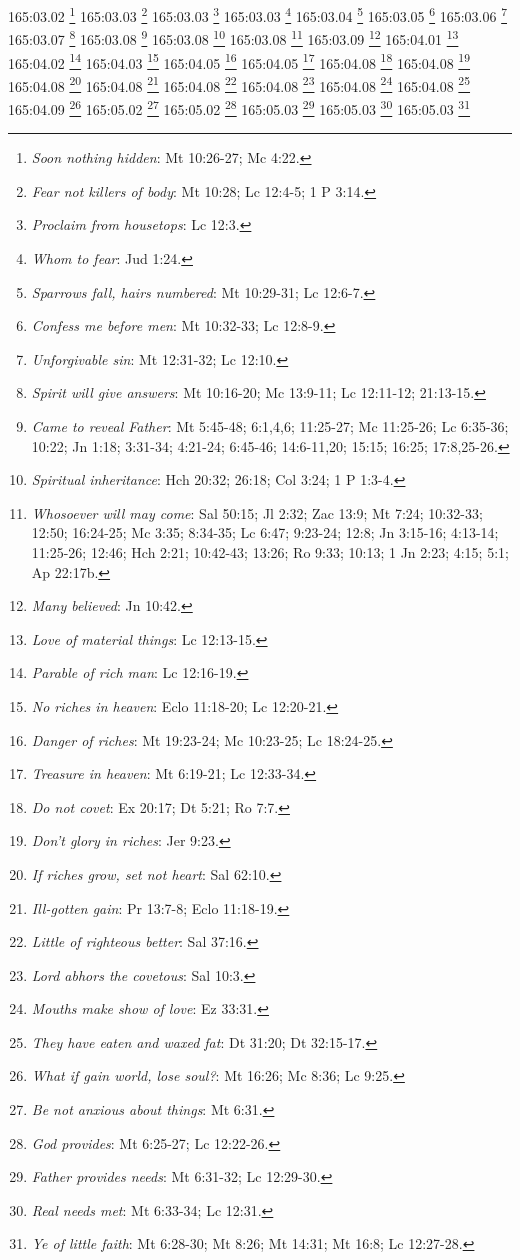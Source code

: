 165:03.02 \footnote{\textit{Soon nothing hidden}: Mt 10:26-27; Mc 4:22.}
165:03.03 \footnote{\textit{Fear not killers of body}: Mt 10:28; Lc 12:4-5; 1 P 3:14.}
165:03.03 \footnote{\textit{Proclaim from housetops}: Lc 12:3.}
165:03.03 \footnote{\textit{Whom to fear}: Jud 1:24.}
165:03.04 \footnote{\textit{Sparrows fall, hairs numbered}: Mt 10:29-31; Lc 12:6-7.}
165:03.05 \footnote{\textit{Confess me before men}: Mt 10:32-33; Lc 12:8-9.}
165:03.06 \footnote{\textit{Unforgivable sin}: Mt 12:31-32; Lc 12:10.}
165:03.07 \footnote{\textit{Spirit will give answers}: Mt 10:16-20; Mc 13:9-11; Lc 12:11-12; 21:13-15.}
165:03.08 \footnote{\textit{Came to reveal Father}: Mt 5:45-48; 6:1,4,6; 11:25-27; Mc 11:25-26; Lc 6:35-36; 10:22; Jn 1:18; 3:31-34; 4:21-24; 6:45-46; 14:6-11,20; 15:15; 16:25; 17:8,25-26.}
165:03.08 \footnote{\textit{Spiritual inheritance}: Hch 20:32; 26:18; Col 3:24; 1 P 1:3-4.}
165:03.08 \footnote{\textit{Whosoever will may come}: Sal 50:15; Jl 2:32; Zac 13:9; Mt 7:24; 10:32-33; 12:50; 16:24-25; Mc 3:35; 8:34-35; Lc 6:47; 9:23-24; 12:8; Jn 3:15-16; 4:13-14; 11:25-26; 12:46; Hch 2:21; 10:42-43; 13:26; Ro 9:33; 10:13; 1 Jn 2:23; 4:15; 5:1; Ap 22:17b.}
165:03.09 \footnote{\textit{Many believed}: Jn 10:42.}
165:04.01 \footnote{\textit{Love of material things}: Lc 12:13-15.}
165:04.02 \footnote{\textit{Parable of rich man}: Lc 12:16-19.}
165:04.03 \footnote{\textit{No riches in heaven}: Eclo 11:18-20; Lc 12:20-21.}
165:04.05 \footnote{\textit{Danger of riches}: Mt 19:23-24; Mc 10:23-25; Lc 18:24-25.}
165:04.05 \footnote{\textit{Treasure in heaven}: Mt 6:19-21; Lc 12:33-34.}
165:04.08 \footnote{\textit{Do not covet}: Ex 20:17; Dt 5:21; Ro 7:7.}
165:04.08 \footnote{\textit{Don't glory in riches}: Jer 9:23.}
165:04.08 \footnote{\textit{If riches grow, set not heart}: Sal 62:10.}
165:04.08 \footnote{\textit{Ill-gotten gain}: Pr 13:7-8; Eclo 11:18-19.}
165:04.08 \footnote{\textit{Little of righteous better}: Sal 37:16.}
165:04.08 \footnote{\textit{Lord abhors the covetous}: Sal 10:3.}
165:04.08 \footnote{\textit{Mouths make show of love}: Ez 33:31.}
165:04.08 \footnote{\textit{They have eaten and waxed fat}: Dt 31:20; Dt 32:15-17.}
165:04.09 \footnote{\textit{What if gain world, lose soul?}: Mt 16:26; Mc 8:36; Lc 9:25.}
165:05.02 \footnote{\textit{Be not anxious about things}: Mt 6:31.}
165:05.02 \footnote{\textit{God provides}: Mt 6:25-27; Lc 12:22-26.}
165:05.03 \footnote{\textit{Father provides needs}: Mt 6:31-32; Lc 12:29-30.}
165:05.03 \footnote{\textit{Real needs met}: Mt 6:33-34; Lc 12:31.}
165:05.03 \footnote{\textit{Ye of little faith}: Mt 6:28-30; Mt 8:26; Mt 14:31; Mt 16:8; Lc 12:27-28.}
